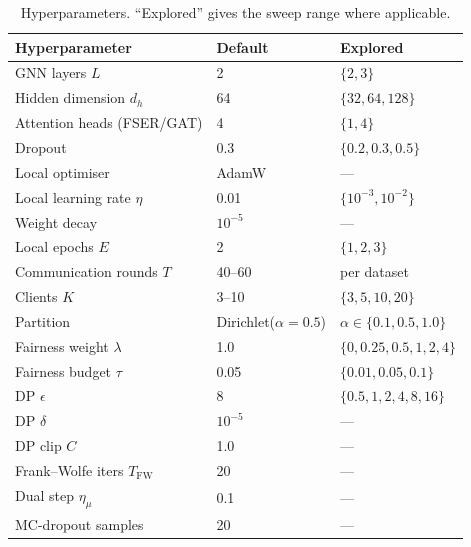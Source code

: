 \documentclass[pdflatex,sn-mathphys-num]{sn-jnl}
\theoremstyle{thmstyleone}%
\theoremstyle{thmstyletwo}%
\theoremstyle{thmstylethree}%
\begin{document}
\clearpage

\begin{table}[htbp]\centering\small
\caption{Composite trust score on Bail: utility, fairness, and privacy combined
via the arithmetic-mean ($p{=}1$) power mean, from the same canonical runs as
Tables~\ref{tab:main-auc}--\ref{tab:main-eod}. Non-private methods score $0$ on
privacy by construction. The calibration-augmented composite is in
Table~\ref{tab:efficiency}. Ranking is sensitive to the reference constants
(stated in text); best in bold.}
\label{tab:trust}

\end{table}

\clearpage

\begin{table}[htbp]\centering\small
\caption{Mapping of TrustFedGNN components to EU AI Act articles and NIST AI RMF
functions.}
\label{tab:compliance}

\end{table}

\clearpage

\begin{table}[htbp]
\centering\small
\caption{Hyperparameters. ``Explored'' gives the sweep range where applicable.}
\label{tab:hyper}
\begin{tabular}{lll}
\toprule
Hyperparameter & Default & Explored \\
\midrule
GNN layers $L$ & 2 & $\{2,3\}$ \\
Hidden dimension $d_h$ & 64 & $\{32,64,128\}$ \\
Attention heads (FSER/GAT) & 4 & $\{1,4\}$ \\
Dropout & 0.3 & $\{0.2,0.3,0.5\}$ \\
Local optimiser & AdamW & --- \\
Local learning rate $\eta$ & 0.01 & $\{10^{-3},10^{-2}\}$ \\
Weight decay & $10^{-5}$ & --- \\
Local epochs $E$ & 2 & $\{1,2,3\}$ \\
Communication rounds $T$ & 40--60 & per dataset \\
Clients $K$ & 3--10 & $\{3,5,10,20\}$ \\
Partition & Dirichlet($\alpha{=}0.5$) & $\alpha\in\{0.1,0.5,1.0\}$ \\
Fairness weight $\lambda$ & 1.0 & $\{0,0.25,0.5,1,2,4\}$ \\
Fairness budget $\tau$ & 0.05 & $\{0.01,0.05,0.1\}$ \\
DP $\epsilon$ & 8 & $\{0.5,1,2,4,8,16\}$ \\
DP $\delta$ & $10^{-5}$ & --- \\
DP clip $C$ & 1.0 & --- \\
Frank--Wolfe iters $T_{\mathrm{FW}}$ & 20 & --- \\
Dual step $\eta_\mu$ & 0.1 & --- \\
MC-dropout samples & 20 & --- \\
\bottomrule
\end{tabular}
\end{table}
\end{document}
